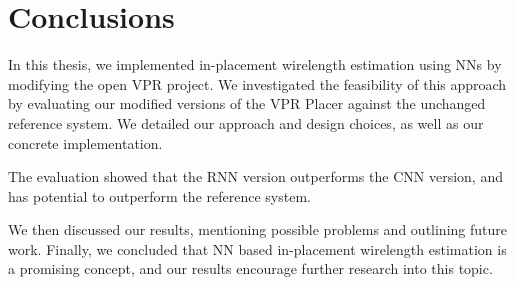 
\chapter{Conclusions}\label{ch:Conclusions}
\glsresetall %

In this thesis, we implemented in-placement wirelength estimation using \glspl{NN} by modifying the open \gls{VPR} project. We investigated the feasibility of this approach by evaluating our modified versions of the \gls{VPR} Placer against the unchanged reference system. We detailed our approach and design choices, as well as our concrete implementation.

The evaluation showed that the \gls{RNN} version outperforms the \gls{CNN} version, and has potential to outperform the reference system. 

We then discussed our results, mentioning possible problems and outlining future work. Finally, we concluded that \gls{NN} based in-placement wirelength estimation is a promising concept, and our results encourage further research into this topic.

